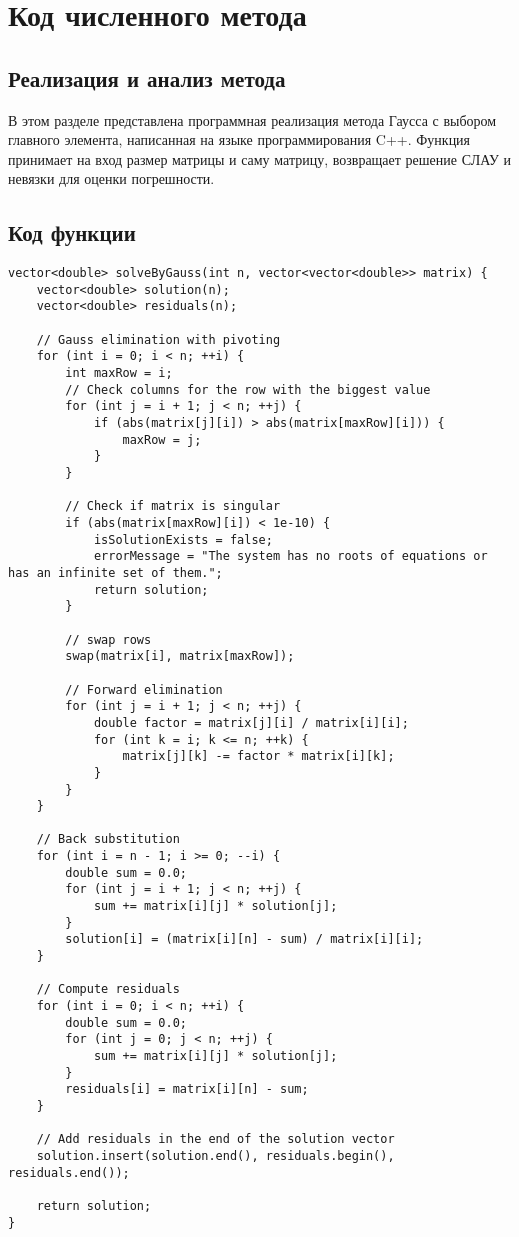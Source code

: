 \newpage
\section{Код численного метода}

\subsection{Реализация и анализ метода}
В этом разделе представлена программная реализация метода Гаусса с выбором главного элемента, написанная на языке программирования C++. Функция принимает на вход размер матрицы и саму матрицу, возвращает решение СЛАУ и невязки для оценки погрешности.

\subsection{Код функции}
\begin{lstlisting}
vector<double> solveByGauss(int n, vector<vector<double>> matrix) {
    vector<double> solution(n);
    vector<double> residuals(n);
    
    // Gauss elimination with pivoting
    for (int i = 0; i < n; ++i) {
        int maxRow = i;
        // Check columns for the row with the biggest value
        for (int j = i + 1; j < n; ++j) {
            if (abs(matrix[j][i]) > abs(matrix[maxRow][i])) {
                maxRow = j;
            }
        }
        
        // Check if matrix is singular
        if (abs(matrix[maxRow][i]) < 1e-10) {
            isSolutionExists = false;
            errorMessage = "The system has no roots of equations or has an infinite set of them.";
            return solution;
        }
        
        // swap rows
        swap(matrix[i], matrix[maxRow]);
        
        // Forward elimination
        for (int j = i + 1; j < n; ++j) {
            double factor = matrix[j][i] / matrix[i][i];
            for (int k = i; k <= n; ++k) {
                matrix[j][k] -= factor * matrix[i][k];
            }
        }
    }
    
    // Back substitution
    for (int i = n - 1; i >= 0; --i) {
        double sum = 0.0;
        for (int j = i + 1; j < n; ++j) {
            sum += matrix[i][j] * solution[j];
        }
        solution[i] = (matrix[i][n] - sum) / matrix[i][i];
    }
    
    // Compute residuals
    for (int i = 0; i < n; ++i) {
        double sum = 0.0;
        for (int j = 0; j < n; ++j) {
            sum += matrix[i][j] * solution[j];
        }
        residuals[i] = matrix[i][n] - sum;
    }
    
    // Add residuals in the end of the solution vector
    solution.insert(solution.end(), residuals.begin(), residuals.end());
    
    return solution;
}
\end{lstlisting}
